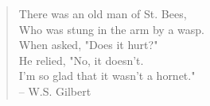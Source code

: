 \documentclass{article}
\begin{document}
\begin{verse}
There was an old man of St. Bees, \\
Who was stung in the arm by a wasp. \\
        When asked, "Does it hurt?" \\
        He relied, "No, it doesn't. \\
I'm so glad that it wasn't a hornet." \\
                -- W.S. Gilbert
\end{verse}
\end{document}
